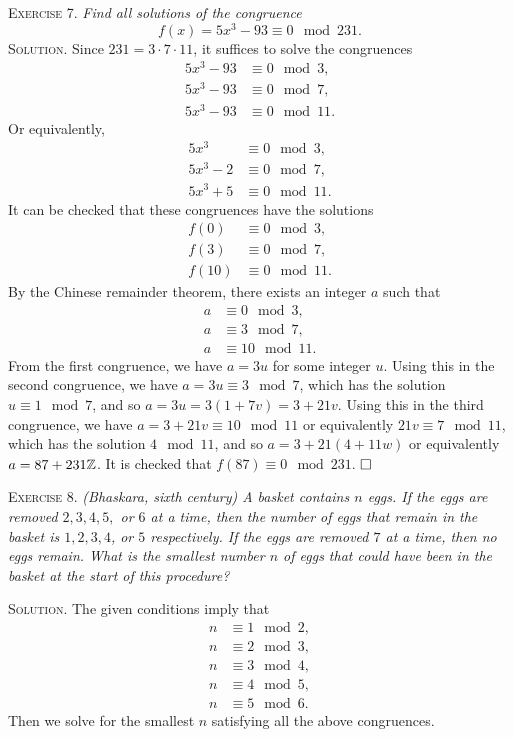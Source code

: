 \documentclass[11pt, leqno]{article}
\newcommand{\done}{\ensuremath{\hfill\square}}
\begin{document}
\textsc{Exercise 7}. \emph{Find all solutions of the congruence 
\begin{displaymath}
f(x) = 5x^3-93 \equiv 0 \mod 231.
\end{displaymath}}\textsc{Solution}. Since $231 = 3\cdot 7\cdot 11$, it suffices to solve the congruences 
\begin{align*}
  5x^3-93 &\equiv 0 \mod 3,\\
  5x^3-93 &\equiv 0 \mod 7,\\
  5x^3-93 &\equiv 0 \mod 11.
\end{align*}Or equivalently,
\begin{align*}
  5x^3 &\equiv 0 \mod 3,\\
  5x^3-2 &\equiv 0 \mod 7,\\
  5x^3+5 &\equiv 0 \mod 11.
\end{align*}
It can be checked that these congruences have the solutions 
\begin{align*}
  f(0) &\equiv 0 \mod 3, \\
  f(3) &\equiv 0 \mod 7, \\
  f(10) &\equiv 0 \mod 11.
\end{align*}
By the Chinese remainder theorem, there exists an integer $a$ such that 
\begin{align*}
  a &\equiv 0 \mod 3, \\
  a &\equiv 3 \mod 7, \\
  a &\equiv 10 \mod 11.
\end{align*}
From the first congruence, we have $a = 3u$ for some integer $u$. Using this in the second congruence, we have $ a = 3u \equiv 3 \mod 7$, which has the solution $u \equiv 1 \mod 7$, and so $a = 3u = 3(1 + 7v) = 3 + 21v$. Using this in the third congruence, we have $ a = 3 + 21v \equiv 10 \mod 11$ or equivalently $21v \equiv 7 \mod 11$, which has the solution $4 \mod 11$, and so $a = 3+21(4 + 11w)$ or equivalently $a = 87 + 231\mathbb{Z}$. It is checked that $f(87) \equiv 0 \mod 231$. \done

\textsc{Exercise 8}. \emph{(Bhaskara, sixth century) A basket contains $n$ eggs. If the eggs are removed $2, 3, 4, 5, $ or $6$ at a time, then the number of eggs that remain in the basket is $1, 2, 3, 4$, or $5$ respectively. If the eggs are removed $7$ at a time, then no eggs remain. What is the smallest number $n$ of eggs that could have been in the basket at the start of this procedure?}

\textsc{Solution}. The given conditions imply that 
\begin{align*}
  n &\equiv 1 \mod 2, \\
  n &\equiv 2 \mod 3, \\
  n &\equiv 3 \mod 4, \\
  n &\equiv 4 \mod 5, \\
  n &\equiv 5 \mod 6.
\end{align*}
Then we solve for the smallest $n$ satisfying all the above congruences.
\end{document}
